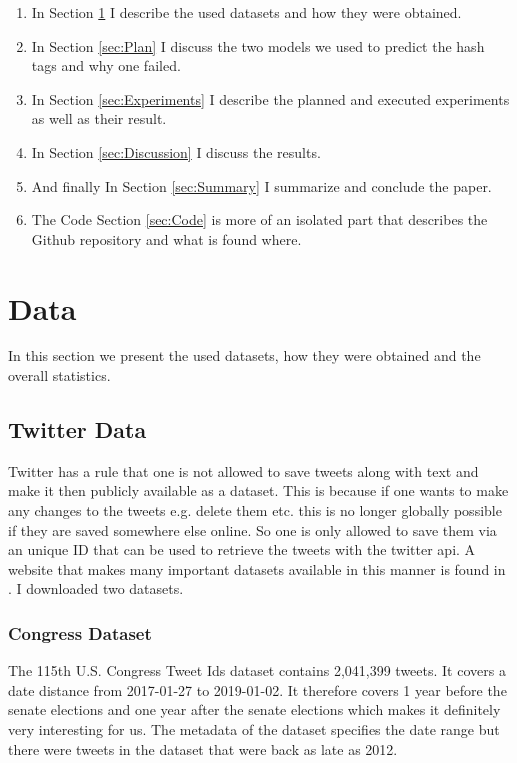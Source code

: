 \documentclass[10pt,conference,compsocconf]{IEEEtran}
\begin{document}
\begin{enumerate}
	\item In Section \ref{sec:Data} I describe the used datasets and how they were obtained. \\
	\item In Section \ref{sec:Plan} I discuss the two models we used to predict the hash tags and why one failed. \\
	\item In Section \ref{sec:Experiments} I describe the planned and executed experiments as well as their result.\\
	\item In Section \ref{sec:Discussion} I discuss the results.
	\item And finally In Section \ref{sec:Summary} I summarize and conclude the paper. \\
	\item The Code Section \ref{sec:Code} is more of an isolated part that describes the Github repository and what is found where. 
\end{enumerate}




\section{Data}
\label{sec:Data}
In this section we present the used datasets, how they were obtained and the overall statistics. 
\subsection{Twitter Data}
Twitter has a rule that one is not allowed to save tweets along with text and make it then publicly available as a dataset. This is because if one wants to make any changes to the tweets e.g. delete them etc. this is no longer globally possible if they are saved somewhere else online. So one is only allowed to save them via an unique ID that can be used to retrieve the tweets with the twitter api. A website that makes many important datasets available in this manner is found in  \cite{twitter_datasets}. I downloaded two datasets.
\subsubsection{Congress Dataset}
The 115th U.S. Congress Tweet Ids dataset contains 2,041,399 tweets. It covers a date distance from 2017-01-27 to 2019-01-02. It therefore covers 1 year before the senate elections and one year after the senate elections which makes it definitely very interesting for us. The metadata of the dataset specifies the date range but there were tweets in the dataset that were back as late as 2012. 
\end{document}

